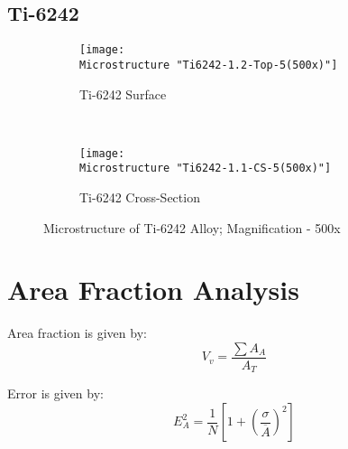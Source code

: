 \subsection{Ti-6242}

\begin{figure}[H]
    \centering
    \begin{subfigure}{0.49\textwidth}
        \texttt{[image: \\Microstructure "Ti6242-1.2-Top-5(500x)"]}
        \caption{Ti-6242 Surface}
        \label{fig:Ti-6242 Surface}
    \end{subfigure}
    ~
    \begin{subfigure}{0.49\textwidth}
        \texttt{[image: \\Microstructure "Ti6242-1.1-CS-5(500x)"]}
        \caption{Ti-6242 Cross-Section}
        \label{fig:Ti-6242 Cross-Section}
    \end{subfigure}
  
    \caption{Microstructure of Ti-6242 Alloy; Magnification - 500x}
    \label{fig:As-Received}
\end{figure}

\iffalse
\begin{figure}[H]
    \centering
    \begin{subfigure}{0.49\textwidth}
        \texttt{[image: \\Microstructure "Ti6246-1.1-Top (1000x)"]}
        \caption{Ti-6246 Surface}
        \label{fig:2a}
    \end{subfigure}
    ~
    \begin{subfigure}{0.49\textwidth}
        \texttt{[image: \\Microstructure "Ti6246-1.1.1-CS (1000x)"]}
        \caption{Ti-6246 Cross-Section}
        \label{fig:2a}
    \end{subfigure}
  
    \caption{SEM Microstructure of Ti-6246 Alloy; Magnification - 1000x}
    \label{fig:As-Received-SEM}
\end{figure}

\fi

\section{Area Fraction Analysis}
Area fraction is given by:
\begin{equation}
V_{v} = \dfrac{\sum A_{A}}{A_{T}}
\end{equation} 

Error is given by:
\begin{equation}
E_{A}^{2} = \dfrac{1}{N}\left[ 1+ \left( \dfrac{\sigma}{\overline A} \right)^{2} \right]
\end{equation} 

